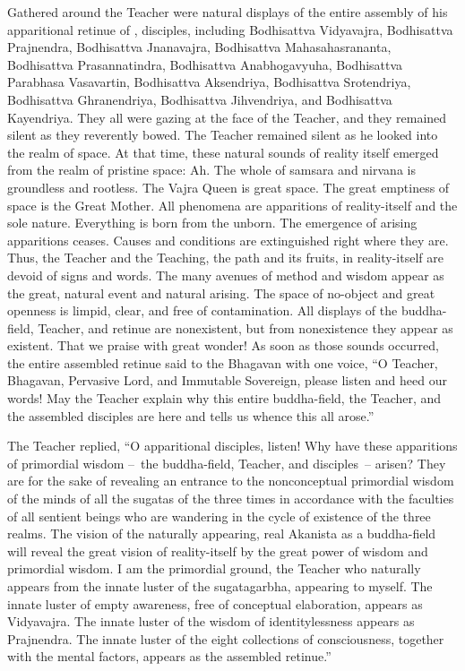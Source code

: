 \documentclass[a4paper,11pt,twoside,final]{book}
\begin{document}
Gathered around the Teacher were natural displays of the entire
assembly of his apparitional retinue of
, disciples, including Bodhisattva
Vidyavajra, Bodhisattva Prajnendra, Bodhisattva Jnanavajra,
Bodhisattva Mahasahasrananta, Bodhisattva Prasannatindra, Bodhisattva
Anabhogavyuha, Bodhisattva Parabhasa Vasavartin, Bodhisattva
Aksendriya, Bodhisattva Srotendriya, Bodhisattva Ghranendriya,
Bodhisattva Jihvendriya, and Bodhisattva Kayendriya. They all were
gazing at the face of the Teacher, and they remained silent as they
reverently bowed. The Teacher remained silent as he looked into the
realm of space. At that time, these natural sounds of reality itself
emerged from the realm of pristine space: Ah. The whole of samsara and
nirvana is groundless and rootless.  The Vajra Queen is great space.
The great emptiness of space is the Great Mother.  All phenomena are
apparitions of reality-itself and the sole nature.  Everything is born
from the unborn.  The emergence of arising apparitions ceases.  Causes
and conditions are extinguished right where they are.  Thus, the
Teacher and the Teaching, the path and its fruits, in reality-itself
are devoid of signs and words.  The many avenues of method and wisdom
appear as the great, natural event and natural arising.  The space of
no-object and great openness is limpid, clear, and free of
contamination.  All displays of the buddha-field, Teacher, and retinue
are nonexistent, but from nonexistence they appear as existent.  That
we praise with great wonder!  As soon as those sounds occurred, the
entire assembled retinue said to the Bhagavan with one voice, ``O
Teacher, Bhagavan, Pervasive Lord, and Immutable Sovereign, please
listen and heed our words! May the Teacher explain why this entire
buddha-field, the Teacher, and the assembled disciples are here and
tells us whence this all arose.''

The Teacher replied, ``O apparitional disciples, listen! Why have
these apparitions of primordial wisdom --~the buddha-field, Teacher,
and disciples~-- arisen? They are for the sake of revealing an
entrance to the nonconceptual primordial wisdom of the minds of all
the sugatas of the three times in accordance with the faculties of all
sentient beings who are wandering in the cycle of existence of the
three realms. The vision of the naturally appearing, real Akanista as
a buddha-field will reveal the great vision of reality-itself by the
great power of wisdom and primordial wisdom. I am the primordial
ground, the Teacher who naturally appears from the innate luster of
the sugatagarbha, appearing to myself. The innate luster of empty
awareness, free of conceptual elaboration, appears as Vidyavajra. The
innate luster of the wisdom of identitylessness appears as
Prajnendra. The innate luster of the eight collections of
consciousness, together with the mental factors, appears as the
assembled retinue.''
\end{document}
